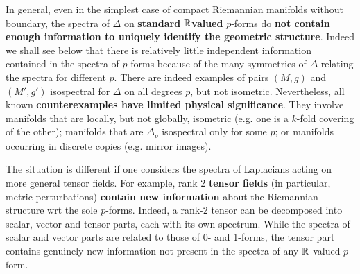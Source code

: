 \documentclass[../geometry_main.tex]{subfiles}
\begin{document}
\begin{mytheorem}
%
In general, even in the simplest case of compact Riemannian manifolds without boundary, the spectra of $\Delta$ on \textbf{standard} $\mathbb{R}$\textbf{valued} $p$-forms do \textbf{not contain enough information to uniquely identify the geometric structure}.
Indeed we shall see below that there is relatively little independent information contained in the spectra of $p$-forms because of the many symmetries of $\Delta$ relating the spectra for different $p$.
%
There are indeed examples of pairs \((M,g)\) and \((M',g')\) isospectral for \(\Delta\) on all degrees \(p\), but not isometric.
Nevertheless, all known \textbf{counterexamples have limited physical significance}.
They involve manifolds that are locally, but not globally, isometric (e.g.  one is a $k$-fold covering of the other); manifolds that are $\Delta_p$ isospectral only for some $p$; or manifolds occurring in discrete copies (e.g. mirror images).
%

The situation is different if one considers the spectra of Laplacians acting on more general tensor fields.
For example, rank 2 \textbf{tensor fields} (in particular, metric perturbations) \textbf{contain new information} about the Riemannian structure wrt the sole $p$-forms.
Indeed, a rank-2 tensor can be decomposed into scalar, vector and tensor parts, each with its own spectrum.
While the spectra of scalar and vector parts are related to those of 0- and 1-forms, the tensor part contains genuinely new information not present in the spectra of any $\mathbb{R}$-valued $p$-form.
%
\end{mytheorem}
\end{document}

